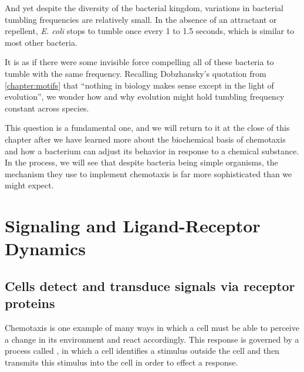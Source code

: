 And yet despite the diversity of the bacterial kingdom, variations in bacterial tumbling frequencies are relatively small. In the absence of an attractant or repellent, \textit{E. coli} stops to tumble once every 1 to 1.5 seconds, which is similar to most other bacteria.

It is as if there were some invisible force compelling all of these bacteria to tumble with the same frequency. Recalling Dobzhansky's quotation from \autoref{chapter:motifs} that ``nothing in biology makes sense except in the light of evolution'', we wonder how and why evolution might hold tumbling frequency constant across species.

This question is a fundamental one, and we will return to it at the close of this chapter after we have learned more about the biochemical basis of chemotaxis and how a bacterium can adjust its behavior in response to a chemical substance. In the process, we will see that despite bacteria being simple organisms, the mechanism they use to implement chemotaxis is far more sophisticated than we might expect.\\

\begin{qbox}\end{qbox}


\FloatBarrier
{}
\section{Signaling and Ligand-Receptor Dynamics}
\label{sec:signal}

\subsection{Cells detect and transduce signals via receptor proteins}

Chemotaxis is one example of many ways in which a cell must be able to perceive a change in its environment and react accordingly. This response is governed by a process called , in which a cell identifies a stimulus outside the cell and then transmits this stimulus into the cell in order to effect a response.

